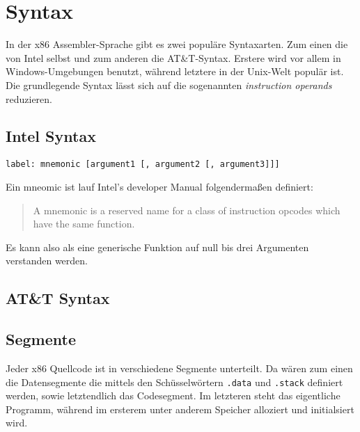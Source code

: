 \section{Syntax}
In der x86 Assembler-Sprache gibt es zwei populäre Syntaxarten.
Zum einen die von Intel selbst und zum anderen die AT\&T-Syntax.
Erstere wird vor allem in Windows-Umgebungen benutzt, während letztere in der Unix-Welt populär ist.
Die grundlegende Syntax lässt sich auf die sogenannten \textit{instruction operands} reduzieren.

\subsection{Intel Syntax}
\texttt{label: mnemonic [argument1 [, argument2 [, argument3]]]}

Ein mneomic ist lauf Intel's developer Manual folgendermaßen definiert:

\begin{quote}A mnemonic is a reserved name for a class of instruction opcodes which have
the same function.
\end{quote}\cite{intelmanual}

Es kann also als eine generische Funktion auf null bis drei Argumenten verstanden werden.

\subsection{AT\&T Syntax}

\subsection{Segmente}
Jeder x86 Quellcode ist in verschiedene Segmente unterteilt. Da wären zum einen die Datensegmente die mittels den Schüsselwörtern \texttt{.data} und \texttt{.stack} definiert werden, sowie letztendlich das Codesegment. Im letzteren steht das eigentliche Programm, während im ersterem unter anderem Speicher alloziert und initialsiert wird.
